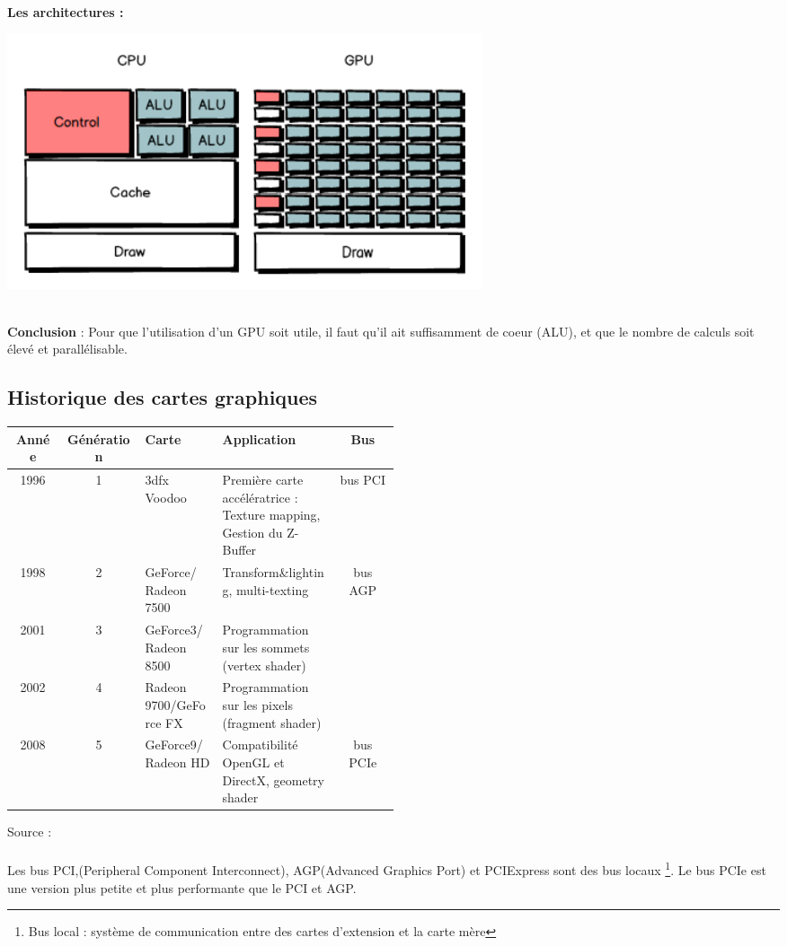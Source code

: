 \textbf{\\Les architectures :}
\\
\begin{center}
\includegraphics[width=14cm]{pipeline/images/GPUCPU.png}
\end{center}

\textbf{\\Conclusion} : Pour que l’utilisation d’un GPU soit utile, il faut qu'il ait suffisamment de coeur (ALU), et que le nombre de calculs soit élevé et parallélisable.



\subsection{Historique des cartes graphiques}
\begin{center}
\begin{tabular}{|c|c|m{0.2\linewidth}|m{0.3\linewidth} |c|}
\hline
Année & Génération & Carte & Application & Bus \\
\hline
1996 & 1 & 3dfx Voodoo & Première carte accélératrice : Texture mapping, Gestion du Z-Buffer & bus PCI\\
\hline
1998 & 2 & GeForce/ Radeon 7500 & Transform\&lighting, multi-texting & bus AGP \\
\cline{1-4}
2001 & 3 & GeForce3/ Radeon 8500 & Programmation sur les sommets (vertex shader)	& \\
\cline{1-4}
2002 & 4 & Radeon 9700/GeForce FX & Programmation sur les pixels (fragment shader)	& \\
\hline
2008 & 5 & GeForce9/ Radeon HD & Compatibilité OpenGL et DirectX,  geometry shader & bus PCIe \\
\hline
\end{tabular}
\end{center}

Source : \cite{historiqueCarte}
\\\\
Les bus PCI,(Peripheral Component Interconnect), AGP(Advanced Graphics Port) et PCIExpress sont des bus locaux
\footnote{ Bus local : système de communication entre des cartes d’extension et la carte mère}.
Le bus PCIe est une version plus petite et plus performante que le PCI et AGP.
